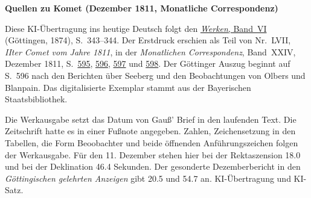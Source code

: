 \clearpage\thispagestyle{empty}
\begin{center}\textbf{Quellen zu Komet (Dezember 1811, Monatliche Correspondenz)}\end{center}
\noindent Diese KI-Übertragung ins heutige Deutsch folgt den \href{https://gdz.sub.uni-goettingen.de/id/PPN236007467}{\textit{Werken}, Band~VI} (Göttingen, 1874), S.~343--344. Der Erstdruck erschien als Teil von Nr.~LVII, \textit{IIter Comet vom Jahre 1811}, in der \textit{Monatlichen Correspondenz}, Band~XXIV, Dezember 1811, S.~\href{https://api.digitale-sammlungen.de/iiif/image/v2/bsb10538613_00611/full/1600,/0/default.jpg}{595}, \href{https://api.digitale-sammlungen.de/iiif/image/v2/bsb10538613_00612/full/1600,/0/default.jpg}{596}, \href{https://api.digitale-sammlungen.de/iiif/image/v2/bsb10538613_00613/full/1600,/0/default.jpg}{597} und \href{https://api.digitale-sammlungen.de/iiif/image/v2/bsb10538613_00614/full/1600,/0/default.jpg}{598}. Der Göttinger Auszug beginnt auf S.~596 nach den Berichten über Seeberg und den Beobachtungen von Olbers und Blanpain. Das digitalisierte Exemplar stammt aus der Bayerischen Staatsbibliothek.
\par\smallskip\noindent Die Werkausgabe setzt das Datum von Gauß’ Brief in den laufenden Text. Die Zeitschrift hatte es in einer Fußnote angegeben. Zahlen, Zeichensetzung in den Tabellen, die Form Beoobachter und beide öffnenden Anführungszeichen folgen der Werkausgabe. Für den 11. Dezember stehen hier bei der Rektaszension 18.0 und bei der Deklination 46.4 Sekunden. Der gesonderte Dezemberbericht in den \textit{Göttingischen gelehrten Anzeigen} gibt 20.5 und 54.7 an. KI-Übertragung und KI-Satz.
\clearpage
